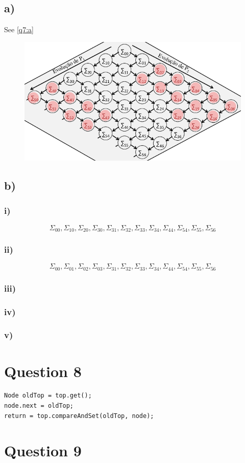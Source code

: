 \documentclass[a4paper,twocolumn]{article}
\begin{document}
\subsection{a)}
See \autoref{q7:a}
\begin{figure}[h]
    \centering
    \includegraphics[width=0.9\linewidth]{q7a.png}
    \caption{}
    \label{q7:a}
\end{figure}
\subsection{b)}
\subsubsection{i)}
$$
\Sigma_{00}, \Sigma_{10}, \Sigma_{20}, \Sigma_{30},
\Sigma_{31}, \Sigma_{32}, \Sigma_{33}, \Sigma_{34},
\Sigma_{44}, \Sigma_{54}, \Sigma_{55}, \Sigma_{56}
$$
\subsubsection{ii)}
$$
\Sigma_{00}, \Sigma_{01}, \Sigma_{02}, \Sigma_{03},
\Sigma_{31}, \Sigma_{32}, \Sigma_{33}, \Sigma_{34},
\Sigma_{44}, \Sigma_{54}, \Sigma_{55}, \Sigma_{56}
$$
\subsubsection{iii)}
\subsubsection{iv)}
\subsubsection{v)}

\section{Question 8}
\begin{lstlisting}
Node oldTop = top.get();
node.next = oldTop;
return = top.compareAndSet(oldTop, node);
\end{lstlisting}
\section{Question 9}
\end{document}
